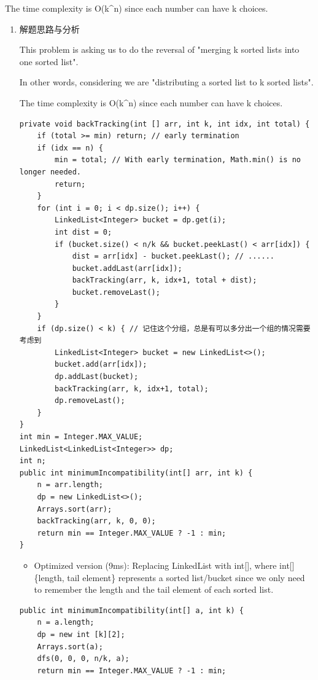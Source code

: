 \documentclass[9pt, b5paaper]{book}
\begin{document}
The time complexity is O(k\^{}n) since each number can have k choices.
\begin{enumerate}
\item 解题思路与分析
\label{sec-8-0-1-1}

This problem is asking us to do the reversal of "merging k sorted lists into one sorted list".

In other words, considering we are "distributing a sorted list to k sorted lists".

The time complexity is O(k\^{}n) since each number can have k choices.

\begin{verbatim}
private void backTracking(int [] arr, int k, int idx, int total) {
    if (total >= min) return; // early termination
    if (idx == n) {
        min = total; // With early termination, Math.min() is no longer needed.
        return;
    }
    for (int i = 0; i < dp.size(); i++) {
        LinkedList<Integer> bucket = dp.get(i);
        int dist = 0;
        if (bucket.size() < n/k && bucket.peekLast() < arr[idx]) {
            dist = arr[idx] - bucket.peekLast(); // ......
            bucket.addLast(arr[idx]);
            backTracking(arr, k, idx+1, total + dist);
            bucket.removeLast();
        }
    }
    if (dp.size() < k) { // 记住这个分组，总是有可以多分出一个组的情况需要考虑到
        LinkedList<Integer> bucket = new LinkedList<>();
        bucket.add(arr[idx]);
        dp.addLast(bucket);
        backTracking(arr, k, idx+1, total);
        dp.removeLast();
    }
}
int min = Integer.MAX_VALUE;
LinkedList<LinkedList<Integer>> dp;
int n;
public int minimumIncompatibility(int[] arr, int k) {
    n = arr.length;
    dp = new LinkedList<>();
    Arrays.sort(arr);
    backTracking(arr, k, 0, 0);
    return min == Integer.MAX_VALUE ? -1 : min;
}
\end{verbatim}
\begin{itemize}
\item Optimized version (9ms): Replacing LinkedList with int[], where int[]\{length, tail element\} represents a sorted list/bucket since we only need to remember the length and the tail element of each sorted list.
\end{itemize}
\begin{verbatim}
public int minimumIncompatibility(int[] a, int k) {
    n = a.length;
    dp = new int [k][2];
    Arrays.sort(a);
    dfs(0, 0, 0, n/k, a);
    return min == Integer.MAX_VALUE ? -1 : min;

\end{verbatim}
\end{enumerate}
\end{document}
